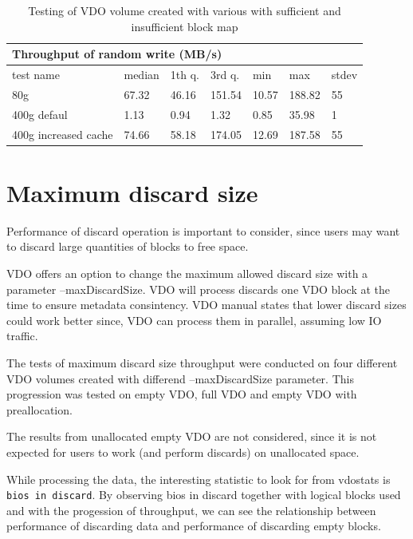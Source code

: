 \documentclass[
  color, %
  table, %
  lof,   %
  lot,   %
]{fithesis3}
\begin{document}
\begin{table}
\centering
\begin{tabular}{|l|l|l|l|l|l|l|}
        \hline
        \multicolumn{7}{|l|}{Throughput of random write (MB/s)} \\ \hline
        test name & median & 1th q. & 3rd q. & min & max & stdev \\ \hline 
80g & 67.32 & 46.16 & 151.54 & 10.57 & 188.82 & 55 \\ \hline
400g defaul & 1.13 & 0.94 & 1.32 & 0.85 & 35.98 & 1 \\ \hline
400g increased cache & 74.66 & 58.18 & 174.05 & 12.69 & 187.58 & 55 \\ \hline
\end{tabular}
\caption{Testing of VDO volume created with various with sufficient and insufficient block map}
\label{tab:blockmap-tab}
\end{table}



\section{Maximum discard size}
Performance of discard operation is important to consider, since users may want to discard large quantities of blocks to free space.

VDO offers an option to change the maximum allowed discard size with a parameter --maxDiscardSize. VDO will process discards one VDO block at the time to ensure metadata consintency. VDO manual states that lower discard sizes could work better since, VDO can process them in parallel, assuming low IO traffic.

The tests of maximum discard size throughput were conducted on four different VDO volumes created with differend --maxDiscardSize parameter. This progression was tested on empty VDO, full VDO and empty VDO with preallocation.

The results from unallocated empty VDO are not considered, since it is not expected for users to work (and perform discards) on unallocated space.

While processing the data, the interesting statistic to look for from vdostats is \texttt{bios in discard}. By observing bios in discard together with logical blocks used and with the progession of throughput, we can see the relationship between performance of discarding data and performance of discarding empty blocks.
\end{document}
